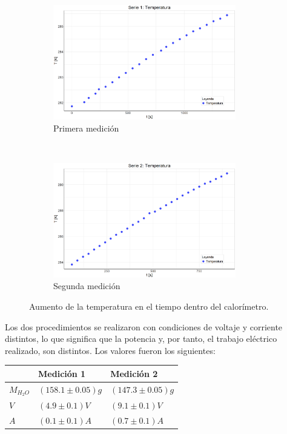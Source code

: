 \documentclass{article}
\begin{document}
\begin{figure}[H]
    \centering
    \begin{subfigure}[t]{0.5\textwidth}
        \centering
        \includegraphics[height=5cm]{temp_1.png}
        \caption{Primera medición}
    \end{subfigure}%
    ~ 
    \begin{subfigure}[t]{0.5\textwidth}
        \centering
        \includegraphics[height=5cm]{temp_2.png}
        \caption{Segunda medición}
    \end{subfigure}
    \caption{Aumento de la temperatura en el tiempo dentro del calorímetro.}
    \label{fig:electemp}
\end{figure}

Los dos procedimientos se realizaron con condiciones de voltaje y corriente distintos, lo que significa que la potencia y, por tanto, el trabajo eléctrico realizado, son distintos. Los valores fueron los siguientes:

\begin{table}[H]
\centering
\begin{tabular}{l|l|l}
           & Medición 1          & Medición 2          \\
\hline
$M_{H_2O}$ & $(158.1 \pm 0.05)g$ & $(147.3 \pm 0.05)g$ \\
$V$        & $(4.9 \pm 0.1)V$    & $(9.1 \pm 0.1)V$    \\
$A$        & $(0.1 \pm 0.1)A$    & $(0.7 \pm 0.1)A$    \\
\end{tabular}
\end{table}
\end{document}
